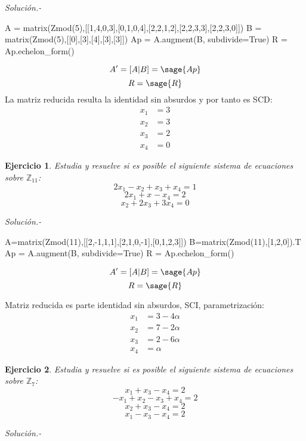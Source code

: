 \documentclass{amsart}
\newtheorem{ejer}{Ejercicio}
\def\z{\mathbb{Z}}
\begin{document}
{\it Soluci\'on.- }

\begin{sageblock}
A = matrix(Zmod(5),[[1,4,0,3],[0,1,0,4],[2,2,1,2],[2,2,3,3],[2,2,3,0]])
B = matrix(Zmod(5),[[0],[3],[4],[3],[3]])
Ap = A.augment(B, subdivide=True)
R = Ap.echelon_form()
\end{sageblock}

$$
A' = [A|B] = \sage{Ap}
$$
$$
R = \sage{R}
$$
La matriz reducida resulta la identidad sin absurdos y por tanto es SCD:
\begin{align*}
	x_1 &= 3 \\
	x_2 &= 3 \\
	x_3 &= 2 \\
	x_4 &= 0
\end{align*}



\begin{ejer} Estudia y resuelve si es posible el siguiente sistema de ecuaciones sobre $\z _{11}$:
\[ 2x_{1} - x_{2} + x_{3} + x_{4} = 1 \]
\[ 2x_{1} + x_{} - x_{4} = 2 \]
\[ x_{2} + 2x_{3} + 3x_{4} = 0 \]
\end{ejer}
{\it Soluci\'on.- }

\begin{sageblock}
A=matrix(Zmod(11),[[2,-1,1,1],[2,1,0,-1],[0,1,2,3]])
B=matrix(Zmod(11),[1,2,0]).T
Ap = A.augment(B, subdivide=True)
R = Ap.echelon_form()
\end{sageblock}

$$
A' = [A|B] = \sage{Ap}
$$
$$
R = \sage{R}
$$

Matriz reducida es parte identidad sin absurdos, SCI, parametrización:
\begin{align*}
	x_1 &= 3 - 4 \alpha \\
	x_2 &= 7 - 2 \alpha \\
	x_3 &= 2 - 6 \alpha \\
	x_4 &= \alpha
\end{align*}




\begin{ejer} Estudia y resuelve si es posible el siguiente sistema de ecuaciones sobre $\z _7$:
\[ x_{1} + x_{3} - x_{4} = 2 \]
\[ -x_{1} + x_{2} - x_{3} + x_{4} = 2 \]
\[ x_{2} + x_{3} - x_{4} = 2 \]
\[ x_{1} - x_{3} - x_{4} = 2 \]
\end{ejer}

{\it Soluci\'on.- }
\end{document}

